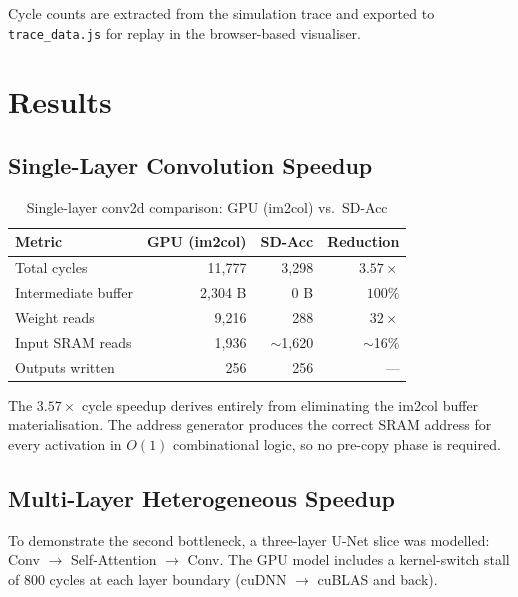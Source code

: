 \documentclass[11pt, letterpaper]{article}
\begin{document}
Cycle counts are extracted from the simulation trace and exported to
\texttt{trace\_data.js} for replay in the browser-based visualiser.

\section{Results}

\subsection{Single-Layer Convolution Speedup}

\begin{table}[h]
\centering
\caption{Single-layer conv2d comparison: GPU (im2col) vs.\ SD-Acc}
\begin{tabular}{lrrr}
\toprule
\textbf{Metric} & \textbf{GPU (im2col)} & \textbf{SD-Acc} & \textbf{Reduction} \\
\midrule
Total cycles          & 11,777  & 3,298   & $3.57\times$ \\
Intermediate buffer   & 2,304 B & 0 B     & $100\%$ \\
Weight reads          & 9,216   & 288     & $32\times$ \\
Input SRAM reads      & 1,936   & $\sim$1,620 & $\sim$16\% \\
Outputs written       & 256     & 256     & — \\
\bottomrule
\end{tabular}
\end{table}

The $3.57\times$ cycle speedup derives entirely from eliminating the im2col
buffer materialisation. The address generator produces the correct SRAM
address for every activation in $O(1)$ combinational logic, so no pre-copy
phase is required.

\subsection{Multi-Layer Heterogeneous Speedup}

To demonstrate the second bottleneck, a three-layer U-Net slice was modelled:
Conv $\to$ Self-Attention $\to$ Conv. The GPU model includes a kernel-switch
stall of 800 cycles at each layer boundary (cuDNN $\to$ cuBLAS and back).
\end{document}
